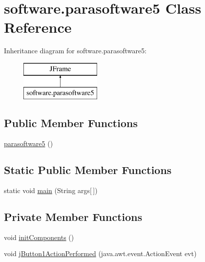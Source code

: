 \hypertarget{classsoftware_1_1parasoftware5}{}\section{software.\+parasoftware5 Class Reference}
\label{classsoftware_1_1parasoftware5}
Inheritance diagram for software.\+parasoftware5\+:\begin{figure}[H]
\begin{center}
\leavevmode
\includegraphics[height=2.000000cm]{classsoftware_1_1parasoftware5}
\end{center}
\end{figure}
\subsection*{Public Member Functions}
\begin{DoxyCompactItemize}
\item 
\mbox{\hyperlink{classsoftware_1_1parasoftware5_ad0430c2ad5591b3b6e6c095661c4e1e9}{parasoftware5}} ()
\end{DoxyCompactItemize}
\subsection*{Static Public Member Functions}
\begin{DoxyCompactItemize}
\item 
static void \mbox{\hyperlink{classsoftware_1_1parasoftware5_afd6fb9e87cb1b0e85c9f3930e8df4fed}{main}} (String args\mbox{[}$\,$\mbox{]})
\end{DoxyCompactItemize}
\subsection*{Private Member Functions}
\begin{DoxyCompactItemize}
\item 
void \mbox{\hyperlink{classsoftware_1_1parasoftware5_a14cb4e4406beda41b9822faeb9decfe9}{init\+Components}} ()
\item 
void \mbox{\hyperlink{classsoftware_1_1parasoftware5_a2288f6e6870dddebb4be6b9279a85016}{j\+Button1\+Action\+Performed}} (java.\+awt.\+event.\+Action\+Event evt)
\end{DoxyCompactItemize}
